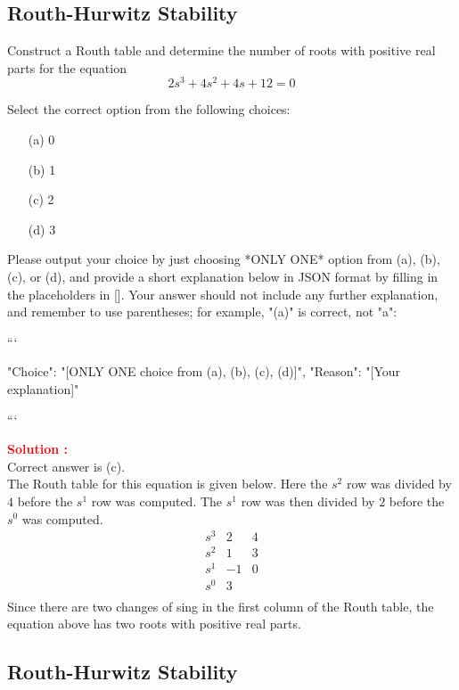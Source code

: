 \documentclass[12pt]{article}
\begin{document}
\clearpage
\subsection{Routh-Hurwitz Stability}

Construct a Routh table and determine the number of roots with positive real parts for the equation
\begin{equation}
    2s^3+4s^2+4s+12 = 0
\end{equation}

Select the correct option from the following choices:
\begin{itemize}
    \item[(a)] 0
    \item[(b)] 1
    \item[(c)] 2
    \item[(d)] 3
\end{itemize}




Please output your choice by just choosing *ONLY ONE* option from (a), (b), (c), or (d), and provide a short explanation below in JSON format by filling in the placeholders in []. Your answer should not include any further explanation, and remember to use parentheses; for example, "(a)" is correct, not "a":

```

{
"Choice": "[ONLY ONE choice from (a), (b), (c), (d)]",
"Reason": "[Your explanation]"
}

```


\textbf{\textcolor{red}{Solution :}} \\
Correct answer is (c).\\
The Routh table for this equation is given below. Here the \(s^2\) row was divided by \(4\) before the \(s^1\) row was computed. The \(s^1\) row was then divided by \(2\) before the \(s^0\) was computed.
\[
\begin{array}{l|cc}
s^3 & 2 & 4  \\
s^2 & 1 & 3 \\
s^1 & -1 & 0  \\
s^0 & 3 &  \\
\end{array}
\]
Since there are two changes of sing in the first column of the Routh table, the equation above has two roots with positive real parts.

\clearpage
\subsection{Routh-Hurwitz Stability}
\end{document}

